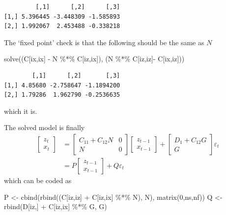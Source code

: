 \documentclass[
  letterpaper,
]{book}
\newenvironment{Shaded}{\begin{snugshade}}{\end{snugshade}}
\newcommand{\DecValTok}[1]{\textcolor[rgb]{0.68,0.00,0.00}{#1}}
\newcommand{\FunctionTok}[1]{\textcolor[rgb]{0.28,0.35,0.67}{#1}}
\newcommand{\NormalTok}[1]{\textcolor[rgb]{0.00,0.23,0.31}{#1}}
\newcommand{\OtherTok}[1]{\textcolor[rgb]{0.00,0.23,0.31}{#1}}
\newcommand{\SpecialCharTok}[1]{\textcolor[rgb]{0.37,0.37,0.37}{#1}}
\begin{document}
\begin{verbatim}
         [,1]      [,2]      [,3]
[1,] 5.396445 -3.448309 -1.585893
[2,] 1.992067  2.453488 -0.338218
\end{verbatim}

The `fixed point' check is that the following should be the same as
\(N\)

\begin{Shaded}
\begin{Highlighting}[]
\FunctionTok{solve}\NormalTok{((C[ix,ix] }\SpecialCharTok{{-}}\NormalTok{ N }\SpecialCharTok{\%*\%}\NormalTok{ C[iz,ix]), (N }\SpecialCharTok{\%*\%}\NormalTok{ C[iz,iz]}\SpecialCharTok{{-}}\NormalTok{ C[ix,iz]))}
\end{Highlighting}
\end{Shaded}

\begin{verbatim}
        [,1]      [,2]       [,3]
[1,] 4.85680 -2.758647 -1.1894200
[2,] 1.79286  1.962790 -0.2536635
\end{verbatim}

which it is.

The solved model is finally \[
\begin{align}
\begin{bmatrix} z_t \\ x_t \end{bmatrix} &= \begin{bmatrix} C_{11}+C_{12}N & 0 \\ N & 0 \end{bmatrix} \begin{bmatrix} z_{t-1} \\ x_{t-1} \end{bmatrix} + \begin{bmatrix} D_1+C_{12}G \\ G \end{bmatrix} \varepsilon_t \\
 &= P \begin{bmatrix} z_{t-1} \\ x_{t-1} \end{bmatrix} + Q \varepsilon_t
\end{align}
\] which can be coded as

\begin{Shaded}
\begin{Highlighting}[]
\NormalTok{P  }\OtherTok{\textless{}{-}} \FunctionTok{cbind}\NormalTok{(}\FunctionTok{rbind}\NormalTok{((C[iz,iz] }\SpecialCharTok{+}\NormalTok{ C[iz,ix] }\SpecialCharTok{\%*\%}\NormalTok{ N), N), }\FunctionTok{matrix}\NormalTok{(}\DecValTok{0}\NormalTok{,ns,nf))}
\NormalTok{Q  }\OtherTok{\textless{}{-}} \FunctionTok{rbind}\NormalTok{(D[iz,] }\SpecialCharTok{+}\NormalTok{ C[iz,ix] }\SpecialCharTok{\%*\%}\NormalTok{ G, G)}
\end{Highlighting}
\end{Shaded}
\end{document}
